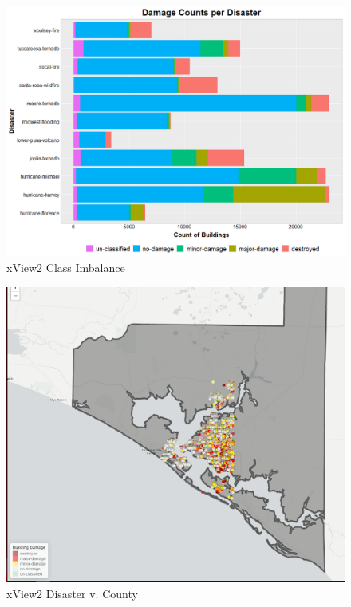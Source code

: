 \documentclass[conference]{IEEEtran}
\begin{document}
\begin{figure}[ht]
\centering\includegraphics[width=1\linewidth]{imbalanced.png}
\caption{xView2 Class Imbalance}
\label{xviewimbal}
\end{figure}

\begin{figure}[ht]
\centering\includegraphics[width=1\linewidth]{leaflet.png}
\caption{xView2 Disaster v. County}
\label{xviewleaflet}
\end{figure}
\end{document}

